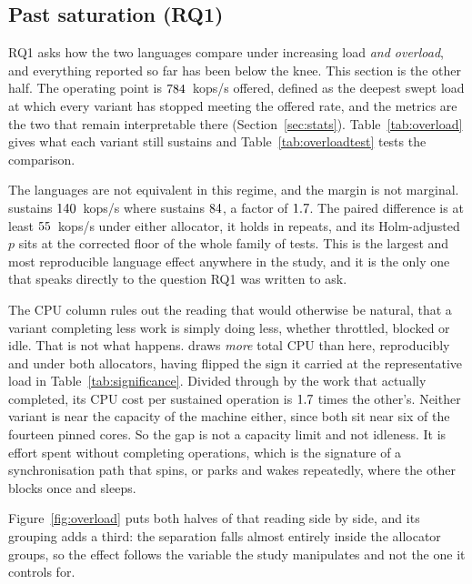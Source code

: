 \documentclass[english,oneside,a4paper,censored,csm,software-track-2020]{HYthesisML}
\begin{document}
\subsection{Past saturation (RQ1)}\label{sec:overload}
RQ1 asks how the two languages compare under increasing load \emph{and overload}, and everything
reported so far has been below the knee. This section is the other half. The operating point is
$784$~kops/s offered, defined as the deepest swept load at which every variant has
stopped meeting the offered rate, and the metrics are the two that remain interpretable there
(Section~\ref{sec:stats}). Table~\ref{tab:overload} gives what each variant still sustains and
Table~\ref{tab:overloadtest} tests the comparison.

The languages are not equivalent in this regime, and the margin is not marginal.
\OverloadSustainedFaster{} sustains $140$~kops/s where \OverloadSustainedSlower{}
sustains $84$, a factor of $1.7$. The paired difference is at least
$55$~kops/s under either allocator, it holds in \OverloadThrAgree{} repeats, and
its Holm-adjusted $p$ sits at the corrected floor of the whole family of \NTests{} tests. This is
the largest and most reproducible language effect anywhere in the study, and it is the only one
that speaks directly to the question RQ1 was written to ask.

The CPU column rules out the reading that would otherwise be natural, that a variant completing
less work is simply doing less, whether throttled, blocked or idle. That is not what happens.
\OverloadSustainedSlower{} draws \emph{more} total CPU than \OverloadSustainedFaster{} here,
reproducibly and under both allocators, having flipped the sign it carried at the representative
load in Table~\ref{tab:significance}. Divided through by the work that actually completed, its
CPU cost per sustained operation is $1.7$ times the other's. Neither
variant is near the capacity of the machine either, since both sit near six of the fourteen pinned
cores. So the gap is not a capacity limit and not idleness. It is effort spent without completing
operations, which is the signature of a synchronisation path that spins, or parks and
wakes repeatedly, where the other blocks once and sleeps.

Figure~\ref{fig:overload} puts both halves of that reading side by side, and its grouping adds a
third: the separation falls almost entirely inside the allocator groups, so the effect
follows the variable the study manipulates and not the one it controls for.
\end{document}
